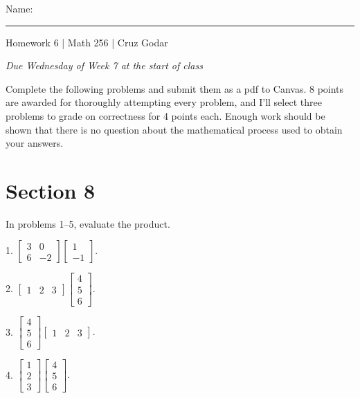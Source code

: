 \documentclass{article}
\begin{document}
\Large Name: \rule{2in}{0.15mm} \hfill Homework 6 | Math 256 | Cruz Godar \vspace{4pt} \normalsize

\textit{Due Wednesday of Week 7 at the start of class}

Complete the following problems and submit them as a pdf to Canvas. 8 points are awarded for thoroughly attempting every problem, and I'll select three problems to grade on correctness for 4 points each. Enough work should be shown that there is no question about the mathematical process used to obtain your answers.

\section{Section 8}

In problems 1--5, evaluate the product.

1. $\displaystyle \left[\begin{array}{cc}3& 0 \\ 6& -2\end{array}\right]\left[\begin{array}{c}1 \\ -1\end{array}\right].$

2. $\displaystyle \left[\begin{array}{ccc}1& 2& 3\end{array}\right]\left[\begin{array}{c}4 \\ 5 \\ 6\end{array}\right].$

3. $\displaystyle \left[\begin{array}{c}4 \\ 5 \\ 6\end{array}\right]\left[\begin{array}{ccc}1& 2& 3\end{array}\right].$

4. $\displaystyle \left[\begin{array}{c}1 \\ 2 \\ 3\end{array}\right]\left[\begin{array}{c}4 \\ 5 \\ 6\end{array}\right].$
\end{document}
